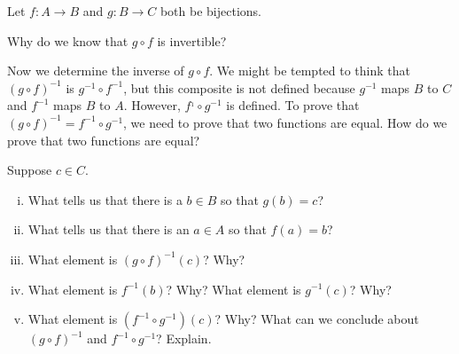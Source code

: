 \begin{activity} \label{act:comp_inverse} Let $f: A \to B$  and  $g: B \to C$ both be bijections. 
	\ba
	\item Why do we know that $g \circ f$ is invertible?
	
	\item Now we determine the inverse of $g \circ f$. We might be tempted to think that $(g \circ f)^{-1}$ is $g^{-1} \circ f^{-1}$, but this composite is not defined because $g^{-1}$ maps $B$ to $C$ and $f^{-1}$ maps $B$ to $A$. However, $f^{_1} \circ g^{-1}$ is defined. To prove that $(g \circ f)^{-1} = f^{-1} \circ g^{-1}$, we need to prove that two functions are equal. How do we prove that two functions are equal? 

	\item Suppose $c \in C$.
		\begin{enumerate}[i.]
		\item What tells us that there is a $b \in B$ so that $g(b) = c$?
		
		\item What tells us that there is an $a \in A$ so that $f(a) = b$?
	
		\item What element is $(g \circ f)^{-1}(c)$? Why?
	
		\item What element is $f^{-1}(b)$? Why? What element is $g^{-1}(c)$? Why?
		
		\item What element is $(f^{-1} \circ g^{-1})(c)$? Why? What can we conclude about $(g \circ f)^{-1}$ and $f^{-1} \circ g^{-1}$? Explain.

		\end{enumerate}
	\ea
	
\end{activity}


